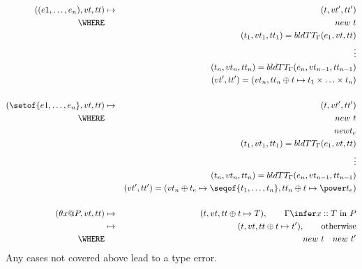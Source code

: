 \begin{eqnarray*}
\\ ((e1,\ldots,e_n),vt,tt)
   &\mapsto& (t,vt',tt')
\\ \WHERE && new~t
\\  && (t_1,vt_1,tt_1) = bldTT_\Gamma(e_1,vt,tt)
\\  && \vdots
\\  && (t_n,vt_n,tt_n) = bldTT_\Gamma(e_n,vt_{n-1},tt_{n-1})
\\ && (vt',tt') = (vt_n,tt_n \oplus t \mapsto t_1 \times \ldots \times t_n)
\\
\\ (\setof{e1,\ldots,e_n},vt,tt)
   &\mapsto& (t,vt',tt')
\\ \WHERE && new~t
\\  && new t_e
\\  && (t_1,vt_1,tt_1) = bldTT_\Gamma(e_1,vt,tt)
\\  && \vdots
\\  && (t_n,vt_n,tt_n) = bldTT_\Gamma(e_n,vt_{n-1},tt_{n-1})
\\ && (vt',tt') = (vt_n \oplus t_e \mapsto \seqof{t_1,\ldots,t_n}
      ,tt_n \oplus t \mapsto \power t_e)
\\
\\ (\theta x @ P,vt,tt)
   &\mapsto& (t,vt,tt \oplus t \mapsto T), \qquad  \Gamma \infer x ::T \mbox{ in } P
\\ &\mapsto& (t,vt,tt \oplus t \mapsto t'), \qquad \mbox{otherwise}
\\ \WHERE && new~t \quad new~t'
\end{eqnarray*}
Any cases not covered above lead to a type error.